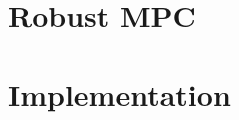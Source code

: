 \documentclass[layout=preview,secnumdepth=2,tight]{sst-custom}
\begin{document}
		\section{Robust MPC}
		
		\section{Implementation}
		
		\iftoggle{do-multicol}{\end{multicols*}}{}
\end{document}
